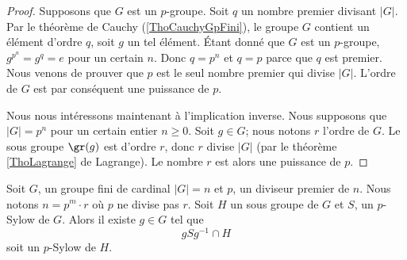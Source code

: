 \begin{proof}
    Supposons que \( G\) est un $p$-groupe. Soit \( q\) un nombre premier divisant \( | G |\). Par le théorème de Cauchy (\ref{ThoCauchyGpFini}), le groupe \( G\) contient un élément d'ordre \( q\), soit \( g\) un tel élément. Étant donné que \( G\) est un $p$-groupe, \( g^{p^n}=g^q=e\) pour un certain \( n\). Donc $q=p^n$ et \( q=p\) parce que \( q\) est premier. Nous venons de prouver que \( p\) est le seul nombre premier qui divise \( | G |\). L'ordre de \( G\) est par conséquent une puissance de \( p\).

    Nous nous intéressons maintenant à l'implication inverse. Nous supposons que \( | G |=p^n\) pour un certain entier \( n\geq 0\). Soit \( g\in G\); nous notons \( r\) l'ordre de \( G\). Le sous groupe \( \gr(g)\) est d'ordre \( r\), donc \( r\) divise \( | G |\) (par le théorème \ref{ThoLagrange} de Lagrange). Le nombre \( r\) est alors une puissance de \( p\).
\end{proof}

\begin{lemma}       \label{LemwDYQMg}
    Soit \( G\), un groupe fini de cardinal \( | G |=n\) et \( p\), un diviseur premier de \( n\). Nous notons \( n=p^m\cdot r\) où \( p\) ne divise pas \( r\). Soit \( H\) un sous groupe de \( G\) et \( S\), un \( p\)-Sylow de \( G\). Alors il existe \( g\in G\) tel que 
    \begin{equation}
        gSg^{-1}\cap H
    \end{equation}
    soit un \( p\)-Sylow de \( H\).
\end{lemma}

